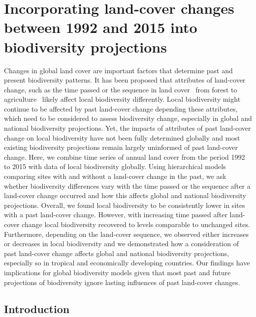 \chapter{Incorporating land-cover changes between 1992 and 2015 into biodiversity projections }
\label{C04}

Changes in global land cover are important factors that determine past and present biodiversity patterns. It has been proposed that attributes of land-cover change, such as the time passed or the sequence in land cover \textendash\ \ie from forest to agriculture \textendash\ likely affect local biodiversity differently. Local biodiversity might continue to be affected by past land-cover change depending these attributes, which need to be considered to assess biodiversity change, especially in global and national biodiversity projections. Yet, the impacts of attributes of past land-cover change on local biodiversity have not been fully determined globally and most existing biodiversity projections remain largely uninformed of past land-cover change. Here, we combine time series of annual land cover from the period 1992 to 2015 with data of local biodiversity globally. Using hierarchical models comparing sites with and without a land-cover change in the past, we ask whether biodiversity differences vary with the time passed or the sequence after a land-cover change occurred and how this affects global and national biodiversity projections. Overall, we found local biodiversity to be consistently lower in sites with a past land-cover change. However, with increasing time passed after land-cover change local biodiversity recovered to levels comparable to unchanged sites. Furthermore, depending on the land-cover sequence, we observed either increases or decreases in local biodiversity and we demonstrated how a consideration of past land-cover change affects global and national biodiversity projections, especially so in tropical and economically developing countries. Our findings have implications for global biodiversity models given that most past and future projections of biodiversity ignore lasting influences of past land-cover changes. 

\section{Introduction}
\label{C04_01}

